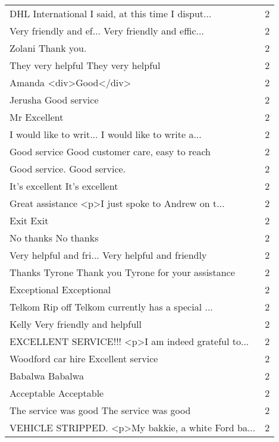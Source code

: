 \begin{tabular}{lr}
DHL International I said, at this time I disput... &        2 \\
Very friendly and ef... Very friendly and effic... &        2 \\
Zolani Thank you.                                  &        2 \\
They very helpful They very helpful                &        2 \\
Amanda <div>Good</div>                             &        2 \\
Jerusha Good service                               &        2 \\
Mr Excellent                                       &        2 \\
I would like to writ... I would like to write a... &        2 \\
Good service Good customer care, easy to reach     &        2 \\
Good service. Good service.                        &        2 \\
It's excellent It's excellent                      &        2 \\
Great assistance <p>I just spoke to Andrew on t... &        2 \\
Exit Exit                                          &        2 \\
No thanks No thanks                                &        2 \\
Very helpful and fri... Very helpful and friendly  &        2 \\
Thanks Tyrone Thank you Tyrone for your assistance &        2 \\
Exceptional Exceptional                            &        2 \\
Telkom Rip off  Telkom currently has a special ... &        2 \\
Kelly Very friendly and helpfull                   &        2 \\
EXCELLENT SERVICE!!! <p>I am indeed grateful to... &        2 \\
Woodford car hire Excellent service                &        2 \\
Babalwa Babalwa                                    &        2 \\
Acceptable Acceptable                              &        2 \\
The service was good The service was good          &        2 \\
VEHICLE STRIPPED. <p>My bakkie, a white Ford ba... &        2 \\

\end{tabular}
